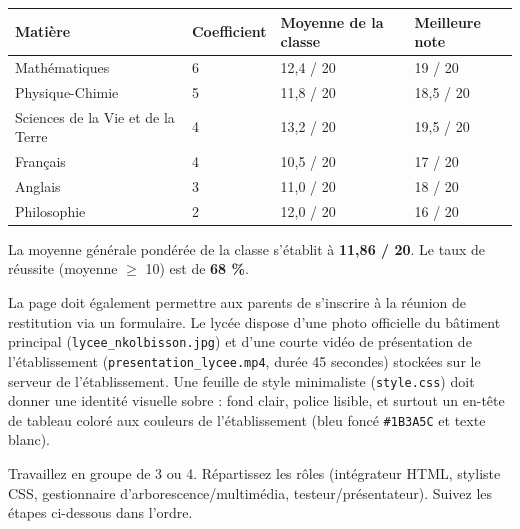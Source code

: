 \documentclass[11pt]{article}
\newcounter{popsec}
\newcounter{popsub}
\newcommand{\courssub}[1]{%
  \stepcounter{popsub}%
  \par\vspace{9pt}\noindent{\popxbold\fontsize{11.5}{13}\selectfont\color{popink}{\color{poporange}\thepopsec.\thepopsub}\hspace{6pt}#1}\par\nopagebreak\vspace{4pt}
}
\begin{document}
\begin{center}
\begin{tabularx}{\linewidth}{|l|X|X|X|}\hline
\textbf{Matière} & \textbf{Coefficient} & \textbf{Moyenne de la classe} & \textbf{Meilleure note} \\\hline
Mathématiques & 6 & 12,4 / 20 & 19 / 20 \\\hline
Physique-Chimie & 5 & 11,8 / 20 & 18,5 / 20 \\\hline
Sciences de la Vie et de la Terre & 4 & 13,2 / 20 & 19,5 / 20 \\\hline
Français & 4 & 10,5 / 20 & 17 / 20 \\\hline
Anglais & 3 & 11,0 / 20 & 18 / 20 \\\hline
Philosophie & 2 & 12,0 / 20 & 16 / 20 \\\hline
\end{tabularx}
\end{center}

La moyenne générale pondérée de la classe s'établit à \textbf{11,86 / 20}. Le taux de réussite (moyenne $\ge$ 10) est de \textbf{68 \%}.

La page doit également permettre aux parents de s'inscrire à la réunion de restitution via un formulaire. Le lycée dispose d'une photo officielle du bâtiment principal (\texttt{lycee\_nkolbisson.jpg}) et d'une courte vidéo de présentation de l'établissement (\texttt{presentation\_lycee.mp4}, durée 45 secondes) stockées sur le serveur de l'établissement. Une feuille de style minimaliste (\texttt{style.css}) doit donner une identité visuelle sobre : fond clair, police lisible, et surtout un en-tête de tableau coloré aux couleurs de l'établissement (bleu foncé \texttt{\#1B3A5C} et texte blanc).

\courssub{Consignes}
Travaillez en groupe de 3 ou 4. Répartissez les rôles (intégrateur HTML, styliste CSS, gestionnaire d'arborescence/multimédia, testeur/présentateur). Suivez les étapes ci-dessous dans l'ordre.
\end{document}
